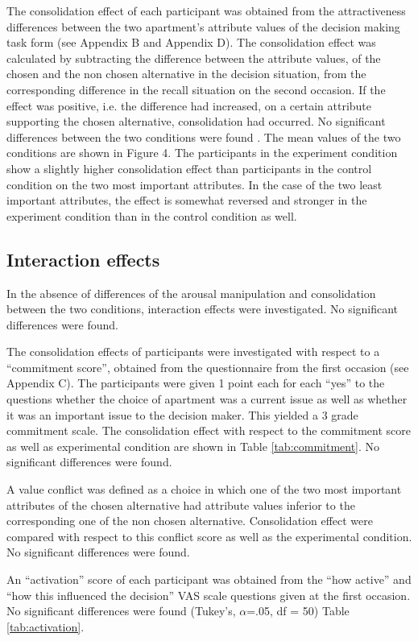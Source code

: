 \documentclass[jou,draftfirst,11pt]{apa6}
\begin{document}
The consolidation effect of each participant was obtained from the
attractiveness differences between the two apartment's attribute
values of the decision making task form (see Appendix B and Appendix
D).  The consolidation effect was calculated by subtracting the
difference between the attribute values, of the chosen and the non
chosen alternative in the decision situation, from the corresponding
difference in the recall situation on the second occasion.  If the
effect was positive, i.e. the difference had increased, on a certain
attribute supporting the chosen alternative, consolidation had
occurred.  No significant differences between the two conditions were
found . The mean values of the two conditions are shown in Figure 4.
The participants in the experiment condition show a slightly higher
consolidation effect than participants in the control condition on the
two most important attributes.  In the case of the two least important
attributes, the effect is somewhat reversed and stronger in the
experiment condition than in the control condition as well.


\subsection{Interaction effects}

In the absence of differences of the arousal manipulation and
consolidation between the two conditions, interaction effects were
investigated. No significant differences were found.

The consolidation effects of participants were investigated with
respect to a ``commitment score'', obtained from the questionnaire from
the first occasion (see Appendix C). The participants were given 1
point each for each ``yes'' to the questions whether the choice of
apartment was a current issue as well as whether it was an important
issue to the decision maker. This yielded a 3 grade commitment scale.
The consolidation effect with respect to the commitment score as well
as experimental condition are shown in Table \ref{tab:commitment}. No
significant differences were found.


A value conflict was defined as a choice in which one of the two most
important attributes of the chosen alternative had attribute values
inferior to the corresponding one of the non chosen
alternative. Consolidation effect were compared with respect to this
conflict score as well as the experimental condition. No significant
differences were found.

An ``activation'' score of each participant was obtained from the ``how
active'' and ``how this influenced the decision'' VAS scale questions
given at the first occasion.   No significant differences were found
(Tukey's, $\alpha$=.05, df = 50) Table \ref{tab:activation}.
\end{document}
